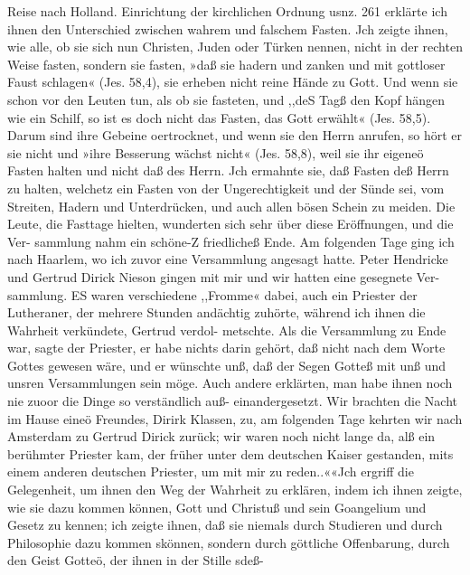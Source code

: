 Reise nach Holland. Einrichtung der kirchlichen Ordnung usnz. 261
erklärte ich ihnen den Unterschied zwischen wahrem und falschem
Fasten. Jch zeigte ihnen, wie alle, ob sie sich nun Christen, Juden
oder Türken nennen, nicht in der rechten Weise fasten, sondern sie
fasten, »daß sie hadern und zanken und mit gottloser Faust schlagen«
(Jes. 58,4), sie erheben nicht reine Hände zu Gott. Und wenn sie
schon vor den Leuten tun, als ob sie fasteten, und ,,deS Tagß den
Kopf hängen wie ein Schilf, so ist es doch nicht das Fasten, das
Gott erwählt« (Jes. 58,5). Darum sind ihre Gebeine oertrocknet,
und wenn sie den Herrn anrufen, so hört er sie nicht und »ihre
Besserung wächst nicht« (Jes. 58,8), weil sie ihr eigeneö Fasten
halten und nicht daß des Herrn. Jch ermahnte sie, daß Fasten
deß Herrn zu halten, welchetz ein Fasten von der Ungerechtigkeit
und der Sünde sei, vom Streiten, Hadern und Unterdrücken, und
auch allen bösen Schein zu meiden. Die Leute, die Fasttage
hielten, wunderten sich sehr über diese Eröffnungen, und die Ver-
sammlung nahm ein schöne-Z friedlicheß Ende.
Am folgenden Tage ging ich nach Haarlem, wo ich zuvor eine
Versammlung angesagt hatte. Peter Hendricke und Gertrud
Dirick Nieson gingen mit mir und wir hatten eine gesegnete Ver-
sammlung. ES waren verschiedene ,,Fromme« dabei, auch ein
Priester der Lutheraner, der mehrere Stunden andächtig zuhörte,
während ich ihnen die Wahrheit verkündete, Gertrud verdol-
metschte. Als die Versammlung zu Ende war, sagte der Priester,
er habe nichts darin gehört, daß nicht nach dem Worte Gottes
gewesen wäre, und er wünschte unß, daß der Segen Gotteß mit
unß und unsren Versammlungen sein möge. Auch andere erklärten,
man habe ihnen noch nie zuoor die Dinge so verständlich auß-
einandergesetzt.
Wir brachten die Nacht im Hause eineö Freundes, Dirirk
Klassen, zu, am folgenden Tage kehrten wir nach Amsterdam zu
Gertrud Dirick zurück; wir waren noch nicht lange da, alß ein
berühmter Priester kam, der früher unter dem deutschen Kaiser
gestanden, mits einem anderen deutschen Priester, um mit mir zu
reden..««Jch ergriff die Gelegenheit, um ihnen den Weg der
Wahrheit zu erklären, indem ich ihnen zeigte, wie sie dazu kommen
können, Gott und Christuß und sein Goangelium und Gesetz zu
kennen; ich zeigte ihnen, daß sie niemals durch Studieren und
durch Philosophie dazu kommen skönnen, sondern durch göttliche
Offenbarung, durch den Geist Gotteö, der ihnen in der Stille sdeß-


